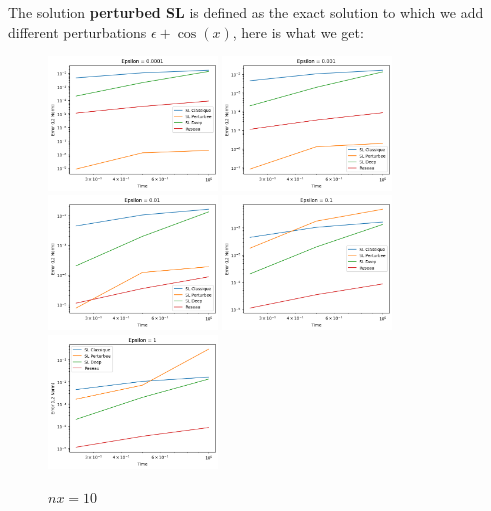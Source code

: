 \documentclass{article}
\begin{document}
The solution \textbf{perturbed SL} is defined as the exact solution to which we add different perturbations $\epsilon + \cos(x)$, here is what we get:\\

\begin{figure}[!h]
    \centering
    \includegraphics[width=0.4\textwidth]{images/10ep21.png}
    \includegraphics[width=0.4\textwidth]{images/10ep22.png}
    \includegraphics[width=0.4\textwidth]{images/10ep23.png}
    \includegraphics[width=0.4\textwidth]{images/10ep24.png}
    \includegraphics[width=0.4\textwidth]{images/10ep25.png}
    \caption{$nx = 10$}
\end{figure}
\end{document}
